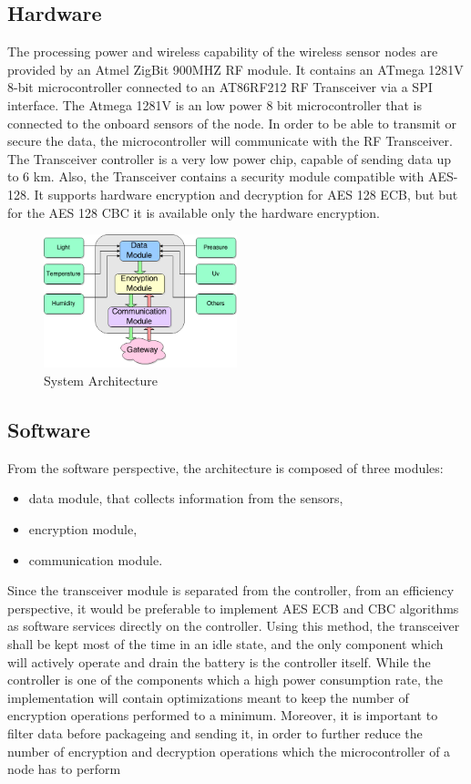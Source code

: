 \label{chap:arch}
\subsection{Hardware}

The processing power and wireless capability of the wireless sensor nodes are provided by an Atmel
ZigBit 900MHZ RF module. It contains an ATmega 1281V 8-bit microcontroller connected to an
AT86RF212 RF Transceiver via a SPI interface. The Atmega 1281V is an low power 8 bit microcontroller
that is connected to the onboard sensors of the node. In order to be able to transmit or secure the
data, the microcontroller will communicate with the RF Transceiver. The Transceiver controller is a very low power chip,
capable of sending data up to 6 km. Also, the Transceiver contains a security module compatible
with AES-128. It supports hardware encryption and decryption for AES 128 ECB, but but for the AES
128 CBC it is available only the hardware encryption.


\begin{figure}[ht] \centering
  \includegraphics[width=0.5\textwidth]{img/wsn-soa-system-arch.png}
  \caption{System Architecture}
\end{figure}

\subsection{Software}

From the software perspective, the architecture is composed of three modules:
\begin{itemize}
\item data module, that
collects information from the sensors,
\item encryption module,
\item communication module.
\end{itemize}

Since the transceiver module is separated from the controller, from an efficiency perspective, it 
would be preferable to implement AES ECB and CBC algorithms as software services directly on the 
controller. Using this method, the transceiver shall be kept most of the time in an idle state, 
and the only component which will actively operate and drain the battery is the controller itself.
While the controller is one of the components which a high power consumption rate, the implementation 
will contain optimizations meant to keep the number of encryption operations performed to a minimum.
Moreover, it is important to filter data before packageing and sending it, in order to further 
reduce the number of encryption and decryption operations which the microcontroller of a node has 
to perform

